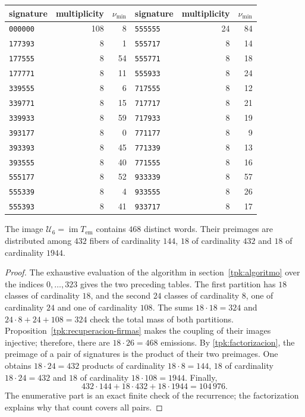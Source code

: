 \begin{tablacompleta}[htbp]
\caption{The twenty-six multiplicative signatures.}
\label{tpk:firmas-multiplicativas}
\begin{tabular}{@{}lrr@{\qquad}lrr@{}}
\toprule
signature&multiplicity&\(\nu_{\min}\)&signature&multiplicity&\(\nu_{\min}\)\\
\midrule
\texttt{000000}&108&8&\texttt{555555}&24&84\\
\texttt{177393}&8&1&\texttt{555717}&8&14\\
\texttt{177555}&8&54&\texttt{555771}&8&18\\
\texttt{177771}&8&11&\texttt{555933}&8&24\\
\texttt{339555}&8&6&\texttt{717555}&8&12\\
\texttt{339771}&8&15&\texttt{717717}&8&21\\
\texttt{339933}&8&59&\texttt{717933}&8&19\\
\texttt{393177}&8&0&\texttt{771177}&8&9\\
\texttt{393393}&8&45&\texttt{771339}&8&13\\
\texttt{393555}&8&40&\texttt{771555}&8&16\\
\texttt{555177}&8&52&\texttt{933339}&8&57\\
\texttt{555339}&8&4&\texttt{933555}&8&26\\
\texttt{555393}&8&41&\texttt{933717}&8&17\\
\bottomrule
\end{tabular}
\end{tablacompleta}

\begin{proposicion}
\label{tpk:468}
The image \(\mathcal U_6=\operatorname{im}T_{\mathrm{em}}\) contains
\(468\) distinct words. Their preimages are distributed among \(432\)
fibers of cardinality \(144\), \(18\) of cardinality \(432\) and \(18\) of
cardinality \(1944\).
\end{proposicion}
\begin{proof}
The exhaustive evaluation of the algorithm in section~\ref{tpk:algoritmo}
over the indices \(0,\ldots,323\) gives the two preceding tables.
The first partition has \(18\) classes of cardinality \(18\), and the second
\(24\) classes of cardinality \(8\), one of cardinality \(24\) and one of
cardinality \(108\). The sums \(18\cdot18=324\) and
\(24\cdot8+24+108=324\) check the total mass of both partitions.
Proposition~\ref{tpk:recuperacion-firmas} makes the coupling
of their images injective; therefore, there are \(18\cdot26=468\) emissions.
By \eqref{tpk:factorizacion}, the preimage of a pair of signatures is
the product of their two preimages. One obtains \(18\cdot24=432\)
products of cardinality \(18\cdot8=144\), \(18\) of cardinality
\(18\cdot24=432\) and \(18\) of cardinality \(18\cdot108=1944\).
Finally,
\[
 432\cdot144+18\cdot432+18\cdot1944=104\,976.
\]
The enumerative part is an exact finite check of the recurrence;
the factorization explains why that count covers all pairs.
\end{proof}

